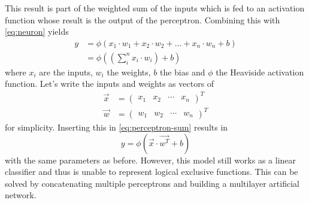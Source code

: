 This result is part of the weighted sum of the inputs which is fed to an activation function whose result is the output of the perceptron.
Combining this with \eqref{eq:neuron} yields
\begin{align}
	\label{eq:perceptron-sum}
	y &= \phi \left( x_1 \cdot w_1 + x_2 \cdot w_2 + \ldots + x_n \cdot w_n + b \right)\\
	  &= \phi \left( \left( \sum_{i}^{n} x_i \cdot w_i \right) + b \right)
\end{align}
where $x_i$ are the inputs, $w_i$ the weights, $b$ the bias and $\phi$ the Heaviside activation function.
Let's write the inputs and weights as vectors of
\begin{align}
	\vec{x} &= \begin{pmatrix} x_1 & x_2 & \cdots & x_n \end{pmatrix}^T \\
	\vec{w} &= \begin{pmatrix} w_1 & w_2 & \cdots & w_n \end{pmatrix}^T 
\end{align}
for simplicity.
Inserting this in \eqref{eq:perceptron-sum} results in
\begin{equation}
	\label{eq:perceptron-activation}
	y = \phi \left( \vec{x} \cdot \vec{w^T} + b \right)
\end{equation}
with the same parameters as before.
However, this model still works as a linear classifier and thus is unable to represent logical exclusive functions.
This can be solved by concatenating multiple perceptrons and building a multilayer artificial network.